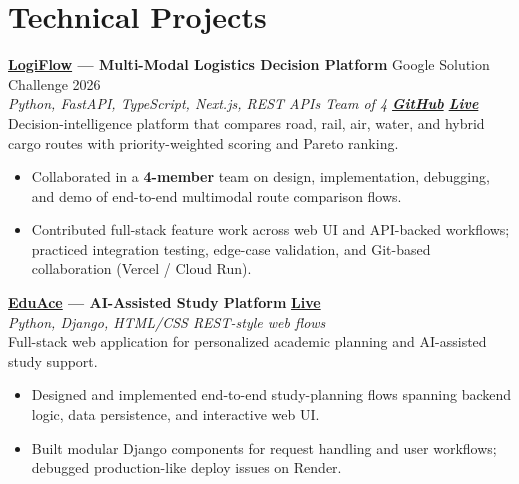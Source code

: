 \documentclass[a4paper,10pt]{article}
\begin{document}
\section{Technical Projects}
\vspace{0.6mm}
\noindent\textbf{\href{https://github.com/kvb1201/LogiFlow-Solution-Challenge-2026}{LogiFlow} --- Multi-Modal Logistics Decision Platform}
\hfill {\small Google Solution Challenge 2026}\\
\textit{\small Python, FastAPI, TypeScript, Next.js, REST APIs \textbar{} Team of 4 \textbar{}
\href{https://github.com/kvb1201/LogiFlow-Solution-Challenge-2026}{\textbf{GitHub}} \textbar{}
\href{https://logi-flow-solution-challenge-2026.vercel.app/}{\textbf{Live}}}\\[0.4mm]
Decision-intelligence platform that compares road, rail, air, water, and hybrid cargo routes with priority-weighted scoring and Pareto ranking.
\begin{itemize}
  \item Collaborated in a \textbf{4-member} team on design, implementation, debugging, and demo of end-to-end multimodal route comparison flows.
  \item Contributed full-stack feature work across web UI and API-backed workflows; practiced integration testing, edge-case validation, and Git-based collaboration (Vercel / Cloud Run).
\end{itemize}

\vspace{0.8mm}
\noindent\textbf{\href{https://eduace.onrender.com/}{EduAce} --- AI-Assisted Study Platform}
\hfill \href{https://eduace.onrender.com/}{\textbf{\small Live}}\\
\textit{\small Python, Django, HTML/CSS \textbar{} REST-style web flows}\\[0.4mm]
Full-stack web application for personalized academic planning and AI-assisted study support.
\begin{itemize}
  \item Designed and implemented end-to-end study-planning flows spanning backend logic, data persistence, and interactive web UI.
  \item Built modular Django components for request handling and user workflows; debugged production-like deploy issues on Render.
\end{itemize}
\end{document}
